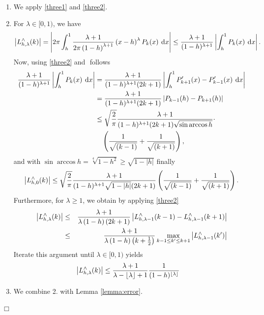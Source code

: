 \documentclass[11pt,a4paper,twoside,bibtotoc]{scrartcl}
\theoremstyle{plain}
\theoremstyle{definition}
\theoremstyle{remark}
\newenvironment{proof}{{\bf Proof.}}{$\Box$}
\newcommand{\abs}[1]{\ensuremath{\left\vert#1\right\vert}}
\newcommand{\fun}[2]{\ensuremath{#1{\hspace{-0.4ex}}\left(#2\right)}}
\newcommand{\paren}[1]{\ensuremath{\left(#1\right)}}
\newcommand{\encl}[3]{\ensuremath{\left#1#2\right#3}}
\newcommand{\dx}{\text{\rm{d}}}
\newcommand{\floor}[1]{\encl{\lfloor}{#1}{\rfloor}}
\numberwithin{equation}{section}
\numberwithin{table}{section}
\numberwithin{figure}{section}
\begin{document}
\begin{proof}
  \begin{enumerate}
  \item We apply \eqref{three1} and \eqref{three2}.
  \item For $\lambda \in [0,1)$, we have
    \begin{equation*}
      \left|\fun{L_{h,\lambda}^{\wedge}}{k}\right| 
      = \abs{2\pi \int_{h}^1 \frac{\lambda+1}{2\pi\paren{1-h}^{\lambda+1}} 
        \paren{x-h}^{\lambda} \fun{P_{k}}{x} \: \dx x} 
      \le \frac{\lambda+1}{(1-h)^{\lambda+1}}\abs{\int_{h}^1 \fun{P_{k}}{x} \: \dx x}.
    \end{equation*}
    Now, using \eqref{three2} and ${}$ follows
    \begin{align*}
      \frac{\lambda+1}{(1-h)^{\lambda+1}}\abs{\int_{h}^1 \fun{P_{k}}{x} \: \dx x}
      & = \frac{\lambda+1}{(1-h)^{\lambda+1}(2k+1)}
          \abs{\int_{h}^1 \fun{P_{k+1}'}{x} - \fun{P_{k-1}'}{x} \: \dx x}\\
      & = \frac{\lambda+1}{(1-h)^{\lambda+1}(2k+1)}
          \abs{\fun{P_{k-1}}{h} - \fun{P_{k+1}}{h}}\\
      & \le \sqrt{\frac{2}{\pi}}\frac{\lambda+1}{(1-h)^{\lambda+1}(2k+1)
            \sqrt{\sin\arccos h}} \cdot \\
      & \quad \paren{\frac{1}{\sqrt{(k-1)}} + \frac{1}{\sqrt{(k+1)}}},
    \end{align*}
    and with $\sin\arccos h = \sqrt[4]{1-h^2} \ge \sqrt{1-|h|}$ finally
    \begin{equation*}
      \left|\fun{L_{h,0}^{\wedge}}{k}\right| \le 
      \sqrt{\frac{2}{\pi}}\frac{\lambda+1}{(1-h)^{\lambda+1}\sqrt{1-|h|}(2k+1)}
      \paren{\frac{1}{\sqrt{(k-1)}} + \frac{1}{\sqrt{(k+1)}}}.
    \end{equation*}
    Furthermore, for $\lambda \ge 1$, we obtain by applying \eqref{three2}
    \begin{eqnarray*}
      \left|\fun{L_{h,\lambda}^{\wedge}}{k}\right| &\le&
      \frac{\lambda+1}{\lambda\left(1-h\right)\left(2k+1\right)}
      \left|\fun{L_{h,\lambda-1}^{\wedge}}{k-1}-
        \fun{L_{h,\lambda-1}^{\wedge}}{k+1}\right|\\ &\le&
      \frac{\lambda+1}{\lambda\left(1-h\right)\left(k+\frac{1}{2}\right)}
      \max\limits_{k-1\le k'\le k+1}
      \left|\fun{L_{h,\lambda-1}^{\wedge}}{k'}\right|
    \end{eqnarray*}
    Iterate this argument until $\lambda \in [0,1)$ yields
    \begin{align*}
      \left|\fun{L_{h,\lambda}^{\wedge}}{k}\right| 
      & \le \frac{\lambda+1}{\lambda-\floor{\lambda}+1} \frac{1}{(1-h)^{\floor{\lambda}}}
    \end{align*}
  \item We combine 2. with Lemma \ref{lemma:error}. 
  \end{enumerate}
\end{proof}
\end{document}
